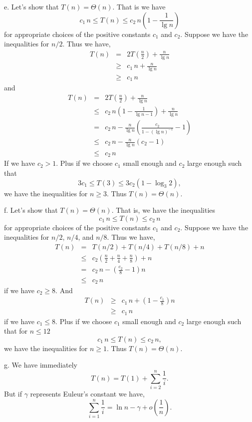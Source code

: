 \documentclass[a4paper,12pt]{article}
\newcommand{\subpar}[1]{\medskip \noindent #1.}
\begin{document}
\subpar{e} Let's show that $T(n) = \Theta(n)$.  That is we have
\[ c_1\,n \le T(n) \le c_2\,n\left(1 - \frac{1}{\lg n}\right)\]
for appropriate choices of the positive constants $c_1$ and $c_2$.
Suppose we have the inequalities for $n/2$.  Thus we have,
\begin{eqnarray*}
  T(n) &=& 2T\left(\frac{n}{2}\right) + \frac{n}{\lg n} \\
  &\ge& c_1\,n + \frac{n}{\lg n} \\
  &\ge& c_1\,n
\end{eqnarray*}
and
\begin{eqnarray*}
  T(n) &=& 2T\left(\frac{n}{2}\right) + \frac{n}{\lg n} \\
  &\le& c_2\,n\left(1 - \frac{1}{\lg n - 1}\right) + \frac{n}{\lg n}
  \\
  &=& c_2\,n - \frac{n}{\lg n}\left(\frac{c_2}{1 - (\lg n)^{-1}} -
  1\right) \\
  &\le& c_2\,n - \frac{n}{\lg n}(c_2 - 1) \\
  &\le& c_2\,n
\end{eqnarray*}
If we have $c_2 > 1$.  Plus if we choose $c_1$ small enough and $c_2$
large enough such that
\[ 3c_1\le T(3) \le 3c_2(1 - \log_3 2),\]
we have the inequalities for $n \ge 3$.  Thus $T(n) = \Theta(n)$.

\subpar{f} Let's show that $T(n) = \Theta(n)$.  That is, we have the
inequalities
\[ c_1\,n \le T(n) \le c_2\,n\]
for appropriate choices of the positive constants $c_1$ and $c_2$.
Suppose we have the inequalities for $n/2$, $n/4$, and $n/8$.  Thus we
have,
\begin{eqnarray*}
  T(n) &=& T(n/2) + T(n/4) + T(n/8) + n \\
  &\le& c_2\left(\frac{n}{2} + \frac{n}{4} + \frac{n}{8}\right) + n \\
  &=& c_2\,n - \left(\frac{c_2}{8} - 1\right)n \\
  &\le& c_2\,n
\end{eqnarray*}
if we have $c_2 \ge 8$. And
\begin{eqnarray*}
  T(n) &\ge& c_1\,n + \left(1 - \frac{c_1}{8}\right)n \\
  &\ge& c_1\,n
\end{eqnarray*}
if we have $c_1 \le 8$.  Plus if we choose $c_1$ small enough and
$c_2$ large enough such that for $ n \le 12$
\[ c_1\,n \le T(n) \le c_2\,n,\]
we have the inequalities for $n\ge 1$.  Thus $T(n) = \Theta(n)$.

\subpar{g}  We have immediately
\[ T(n) = T(1) + \sum_{i=2}^n \frac{1}{i}.\]
But if $\gamma$ represents Euleur's constant we have,
\[ \sum_{i=1}^n \frac{1}{i} = \ln n - \gamma +
o\left(\frac{1}{n}\right).\]
\end{document}
